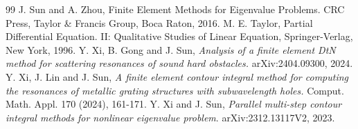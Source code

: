 \documentclass{article}
\begin{document}
\begin{thebibliography}{99}
		 J. Sun and A. Zhou, Finite Element Methods for Eigenvalue Problems. CRC Press, Taylor \& Francis Group, Boca Raton, 2016.
		 M. E. Taylor, Partial Differential Equation. II: Qualitative Studies of Linear Equation, Springer-Verlag, New York, 1996.
		 Y. Xi, B. Gong and J. Sun, {\em Analysis of a finite element DtN method for scattering resonances of sound hard obstacles.} arXiv:2404.09300, 2024.
		 Y. Xi, J. Lin and J. Sun, {\em A finite element contour integral method for computing the resonances of metallic grating structures with subwavelength holes.} Comput. Math. Appl. 170 (2024), 161-171.
		 Y. Xi and J. Sun,
		{\em Parallel multi-step contour integral methods for nonlinear eigenvalue problem}. arXiv:2312.13117V2, 2023.	

\end{thebibliography}
\end{document}
